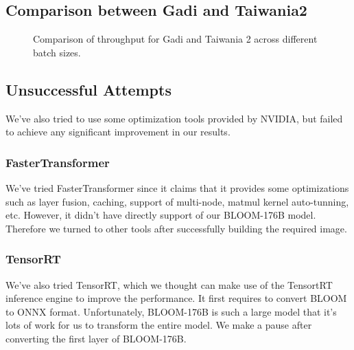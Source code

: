 \subsection{Comparison between Gadi and Taiwania2}

\begin{figure}[h!]
\centering
{}
\caption{Comparison of throughput for Gadi and Taiwania 2 across different batch sizes.}
\end{figure}


\subsection{Unsuccessful Attempts}
We've also tried to use some optimization tools provided by NVIDIA, but failed to achieve any significant improvement in our results.
\subsubsection{FasterTransformer}
We've tried FasterTransformer since it claims that it provides some optimizations such as layer fusion, caching, support of multi-node, matmul kernel auto-tunning, etc.
However, it didn't have directly support of our BLOOM-176B model. Therefore we turned to other tools after successfully building the required image.
\subsubsection{TensorRT}
We've also tried TensorRT, which we thought can make use of the TensortRT inference engine to improve the performance.
It first requires to convert BLOOM to ONNX format. Unfortunately, BLOOM-176B is such a large model that it's lots of work for us to transform the entire model. We make a pause after converting the first layer of BLOOM-176B.
